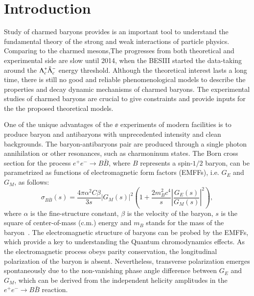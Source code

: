 \section{Introduction}
\label{sec:intro}
Study of charmed baryons provides is an important tool to understand the fundamental theory of the strong and weak interactions of particle physics. Comparing to the charmed mesons,The progresses from both theoretical and experimental side are slow until 2014, when the BESIII started the data-taking around the $\Lambda_{c}^{+}\bar{\Lambda}_{c}^{-}$ energy threshold. Although the theoretical interest lasts a long time, there is still no good and reliable phenomenological models to describe the properties and decay dynamic mechanisms of charmed baryons. The experimental studies of charmed baryons are crucial to give constraints and provide inputs for the the proposed theoretical models. 

One of the unique advantages of the $\ee$ experiments of modern facilities is to produce baryon and antibaryons with unprecedented intensity and clean backgrounds. The baryon-antibaryons pair are produced through a single photon annihilation or other resonances, such as charmoninum states. The Born cross section for the process $e^+e^- \to B\bar{B}$, where $B$ represents a spin-$1/2$ baryon, can be parametrized as functions of electromagnetic form factors (EMFFs), i.e. $G_E$ and $G_M$, as follows:
\begin{equation}
\sigma_{B\bar{B}}(s) = \frac{4\pi\alpha^2C\beta}{3s}|G_M(s)|^2\left( 1 + \frac{2m_B^2c^4}{s}|\frac{G_E(s)}{G_M(s)}|^2\right),
\end{equation}
where $\alpha$ is the fine-structure constant, $\beta$ is the velocity of the baryon, $s$ is the square of center-of-mass (c.m.) energy and $m_B$ stands for the mass of the baryon~\cite{Cabibbo:1961sz}. The electromagnetic structure of baryons can be probed by the EMFFs, which provide a key to understanding the Quantum chromodynamics effects. As the electromagnetic process obeys parity conservation, the longitudinal polarization of the baryon is absent. Nevertheless, transverse polarization emerges spontaneously due to the non-vanishing phase angle difference between $G_E$ and $G_M$, which can be derived from the independent helicity amplitudes in the $e^+e^- \to B\bar{B}$ reaction.  

